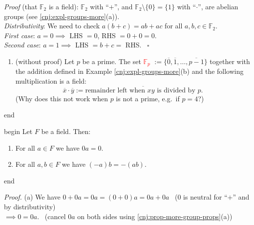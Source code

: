 \documentclass[
  12pt,
  a4paper,
  twoside]{article}
\providecommand{\tightlist}{%
  \setlength{\itemsep}{0pt}\setlength{\parskip}{0pt}}
\theoremstyle{plain}
\theoremstyle{definition}
\begin{document}
\emph{Proof} (that \(\mathbb{F}_2\) is a field):
\(\mathbb{F}_{2}\) with ``\(+\)'', and \(\mathbb{F}_{2} \setminus \{ 0 \} = \{1\}\) with ``\(\cdot\)'', are abelian groups (see \ref{cnj:expl-groups-more}(a)).\\
\hspace*{0.333em}\hspace*{0.333em}\emph{Distributivity}: We need to check \(a(b+c) = ab + ac\) for all \(a, b, c \in \mathbb{F}_{2}\).\\
\hspace*{0.333em}\hspace*{0.333em}\hspace*{0.333em}\hspace*{0.333em}\emph{First case}: \(a=0 \implies\) LHS \(=0\), RHS \(= 0+0 =0\).\\
\hspace*{0.333em}\hspace*{0.333em}\hspace*{0.333em}\hspace*{0.333em}\emph{Second case}: \(a=1 \implies\) LHS \(= b+c =\) RHS. \hfill~{\(\square\)}

\begin{enumerate}
\def\labelenumi{(\alph{enumi})}
\setcounter{enumi}{3}
\tightlist
\item
  (without proof) Let \(p\) be a prime. The set \textcolor{red}{$\mathbb{F}_p$} \(:= \{ \overline{0}, \overline{1}, \dots , \overline{p-1} \}\) together with the addition defined in Example \ref{cnj:expl-groups-more}(b) and the following multiplication is a field:
  \[
  \overline{x} \cdot \overline{y} := \overline{\text{remainder left when $xy$ is divided by $p$}}.
  \]
  (Why does this not work when \(p\) is not a prime, e.g.~if \(p=4\)?)
\end{enumerate}

\csname end

\csname begin\label{cnj:prop-fieldprops}
Let \(F\) be a field. Then:

\begin{enumerate}
\def\labelenumi{(\alph{enumi})}
\tightlist
\item
  For all \(a\in F\) we have \(0a = 0\).
\item
  For all \(a,b\in F\) we have \((-a)b = -(ab)\).
\end{enumerate}

\csname end

\emph{Proof.}
(a) We have \(0 + 0a = 0a = (0 + 0)a = 0a + 0a\) \hfill~{(\(0\) is neutral for ``\(+\)'' and by distributivity)}\\
\hspace*{0.333em}\hspace*{0.333em}\hspace*{0.333em}\(\implies 0 = 0a\). \hfill~{(cancel \(0a\) on both sides using \ref{cnj:prop-more-group-props}(a))}
\end{document}
